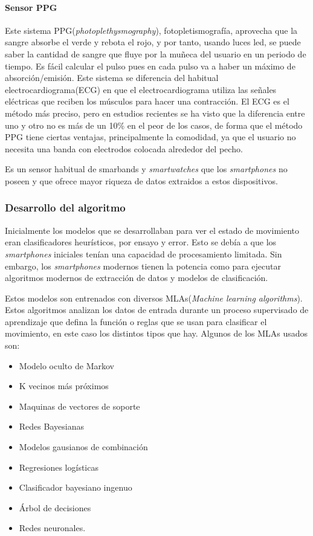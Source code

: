 \documentclass[12pt]{article}
\numberwithin{equation}{section}
\begin{document}
{\paragraph{Sensor PPG}
Este sistema PPG(\textit{photoplethysmography}), fotopletismografía, aprovecha que la sangre absorbe el verde y rebota el rojo, y por tanto, usando luces led, se puede saber la cantidad de sangre que fluye por la muñeca del usuario en un periodo de tiempo. Es fácil calcular el pulso pues en cada pulso va a haber un máximo de absorción/emisión. Este sistema se diferencia del habitual electrocardiograma(ECG) en que el electrocardiograma utiliza las señales eléctricas que reciben los músculos para hacer una contracción. El ECG es el método más preciso, pero en estudios recientes se ha visto que la diferencia entre uno y otro no es más de un 10\% \cite{77489867} en el peor de los casos, de forma que el método PPG tiene ciertas ventajas, principalmente la comodidad, ya que el usuario no necesita una banda con electrodos colocada alrededor del pecho.

Es un sensor habitual de smarbands y \textit{smartwatches} que los \textit{smartphones} no poseen y que ofrece mayor riqueza de datos extraidos a estos dispositivos.

\subsubsection{Desarrollo del algoritmo}
Inicialmente los modelos que se desarrollaban para ver el estado de movimiento eran clasificadores heurísticos, por ensayo y error. Esto se debía a que los \textit{smartphones} iniciales tenían una capacidad de procesamiento limitada. Sin embargo, los \textit{smartphones} modernos tienen la potencia como para ejecutar algoritmos modernos de extracción de datos y modelos de clasificación.

Estos modelos son entrenados con diversos MLAs(\textit{Machine learning algorithms}). Estos algoritmos analizan los datos de entrada durante un proceso supervisado de aprendizaje que defina la función o reglas que se usan para clasificar el movimiento, en este caso los distintos tipos que hay. Algunos de los MLAs usados son:

\begin{itemize}
\item Modelo oculto de Markov
\item K vecinos más próximos
\item Maquinas de vectores de soporte
\item Redes Bayesianas
\item Modelos gausianos de combinación
\item Regresiones logísticas
\item Clasificador bayesiano ingenuo
\item Árbol de decisiones
\item Redes neuronales.
\end{itemize}

}
\end{document}
